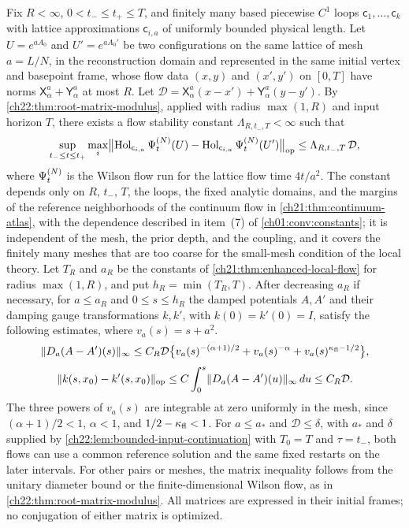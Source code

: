 \begin{remark}\label{ch30:thm:root-matrix-modulus}
Fix $R<\infty$, $0<t_-\le t_+\le T$, and finitely many based piecewise $C^1$ loops $\mathsf c_1,\ldots,\mathsf c_k$ with lattice approximations $\mathsf c_{i,a}$ of uniformly bounded physical length. Let $U=e^{aA_0}$ and $U'=e^{aA_0'}$ be two configurations on the same lattice of mesh $a=L/N$, in the reconstruction domain and represented in the same initial vertex and basepoint frame, whose flow data $(x,y)$ and $(x',y')$ on $[0,T]$ have norms $\mathsf X_\alpha^a+\mathsf Y_\alpha^a$ at most $R$. Let $\mathcal D=\mathsf X_\alpha^a(x-x')+\mathsf Y_\alpha^a(y-y')$. By \cref{ch22:thm:root-matrix-modulus}, applied with radius $\max(1,R)$ and input horizon $T$, there exists a flow stability constant $\Lambda_{R,t_-,T}<\infty$ such that
\[
 \sup_{t_-\le t\le t_+}\max_i\bigl\lVert\operatorname{Hol}_{\mathsf c_{i,a}}\Psi^{(N)}_t(U)-\operatorname{Hol}_{\mathsf c_{i,a}}\Psi^{(N)}_t(U')\bigr\rVert_{\mathrm{op}}\le\Lambda_{R,t_-,T}\,\mathcal D,
\]
where $\Psi^{(N)}_t$ is the Wilson flow run for the lattice flow time $4t/a^2$. The constant depends only on $R$, $t_-$, $T$, the loops, the fixed analytic domains, and the margins of the reference neighborhoods of the continuum flow in \cref{ch21:thm:continuum-atlas}, with the dependence described in item~(7) of \cref{ch01:conv:constants}; it is independent of the mesh, the prior depth, and the coupling, and it covers the finitely many meshes that are too coarse for the small-mesh condition of the local theory. Let $T_R$ and $a_R$ be the constants of \cref{ch21:thm:enhanced-local-flow} for radius $\max(1,R)$, and put $h_R=\min(T_R,T)$. After decreasing $a_R$ if necessary, for $a\le a_R$ and $0\le s\le h_R$ the damped potentials $A,A'$ and their damping gauge transformations $k,k'$, with $k(0)=k'(0)=I$, satisfy the following estimates, where $v_a(s)=s+a^2$.
\[
 \lVert D_a(A-A')(s)\rVert_\infty\le C_R\mathcal D\bigl\{v_a(s)^{-(\alpha+1)/2}+v_a(s)^{-\alpha}+v_a(s)^{\kappa_{\mathrm{fl}}-1/2}\bigr\},
\]
\[
 \lVert k(s,x_0)-k'(s,x_0)\rVert_{\mathrm{op}}\le C\int_0^s\lVert D_a(A-A')(u)\rVert_\infty\,du\le C_R\mathcal D .
\]
The three powers of $v_a(s)$ are integrable at zero uniformly in the mesh, since $(\alpha+1)/2<1$, $\alpha<1$, and $1/2-\kappa_{\mathrm{fl}}<1$. For $a\le a_*$ and $\mathcal D\le\delta$, with $a_*$ and $\delta$ supplied by \cref{ch22:lem:bounded-input-continuation} with $T_0=T$ and $\tau=t_-$, both flows can use a common reference solution and the same fixed restarts on the later intervals. For other pairs or meshes, the matrix inequality follows from the unitary diameter bound or the finite-dimensional Wilson flow, as in \cref{ch22:thm:root-matrix-modulus}. All matrices are expressed in their initial frames; no conjugation of either matrix is optimized.
\end{remark}

